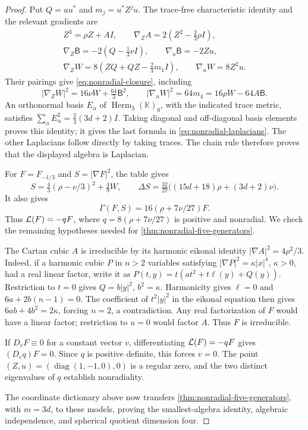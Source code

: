 \begin{proof}
Put \(Q=uu^*\) and \(m_j=u^*Z^ju\). The trace-free characteristic
identity and the relevant gradients are
\begin{gather*}
 Z^3=\rho Z+AI,\qquad
 \nabla_ZA=2(Z^2-\tfrac23\rho I),\\
 \nabla_Z\mathsf{B}=-2(Q-\tfrac13\nu I),\qquad \nabla_u\mathsf{B}=-2Zu,\\
 \nabla_ZW=8(ZQ+QZ-\tfrac23m_1I),\qquad \nabla_uW=8Z^2u.
\end{gather*}
Their pairings give \eqref{eq:nonradial-closure}, including
\[
 |\nabla_ZW|^2=16\nu W+\tfrac{64}{3}\mathsf{B}^2,\qquad
 |\nabla_uW|^2=64m_4=16\rho W-64A\mathsf{B}.
\]
An orthonormal basis \(E_\alpha\) of \(\operatorname{Herm}_3(\mathbb K)_0\),
with the indicated trace metric, satisfies
\(\sum_\alpha E_\alpha^2=\frac23(3d+2)I\).
Taking diagonal and off-diagonal basis elements proves this identity;
it gives the last formula in \eqref{eq:nonradial-laplacians}.
The other Laplacians follow directly by taking traces. The chain
rule therefore proves that the displayed algebra is Laplacian.

For \(F=F_{-1/3}\) and \(S=|\nabla F|^2\), the table gives
\begin{equation}\label{eq:nonradial-gradient-square}
 S=\tfrac43(\rho-\nu/3)^2+\tfrac49W,\qquad
 \Delta S=\tfrac{32}{27}\bigl((15d+18)\rho+(3d+2)\nu\bigr).
\end{equation}
It also gives
\[
 \Gamma(F,S)=16(\rho+7\nu/27)F.
\]
Thus \(\mathcal L(F)=-qF\), where \(q=8(\rho+7\nu/27)\) is positive
and nonradial. We check the remaining hypotheses needed for
\cref{thm:nonradial-five-generators}.

The Cartan cubic \(A\) is irreducible by its harmonic eikonal identity
\(|\nabla A|^2=4\rho^2/3\). Indeed, if a harmonic cubic
\(P\) in \(n>2\) variables satisfying
\(|\nabla P|^2=\kappa|x|^4\), \(\kappa>0\), had a real linear
factor, write it as
\(P(t,y)=t(at^2+t\ell(y)+Q(y))\).
Restriction to \(t=0\) gives \(Q=b|y|^2\), \(b^2=\kappa\).
Harmonicity gives \(\ell=0\) and \(6a+2b(n-1)=0\).
The coefficient of \(t^2|y|^2\) in the eikonal equation then
gives \(6ab+4b^2=2\kappa\), forcing \(n=2\), a contradiction.
Any real factorization of \(F\) would have a linear factor;
restriction to \(u=0\) would factor \(A\). Thus \(F\) is
irreducible.

If \(D_vF\equiv0\) for a constant vector \(v\), differentiating
\(\mathcal L(F)=-qF\) gives \((D_vq)F=0\). Since \(q\) is positive
definite, this forces \(v=0\). The point \((Z,u)=(\operatorname{diag}(1,-1,0),0)\) is a
regular zero, and the two distinct eigenvalues of \(q\) establish
nonradiality.

The coordinate dictionary above now transfers
\cref{thm:nonradial-five-generators}, with \(m=3d\), to these
models, proving the smallest-algebra identity, algebraic independence,
and spherical quotient dimension four.
\end{proof}

